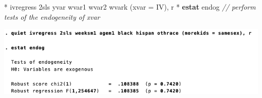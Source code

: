 \documentclass[
  10pt,
  ignorenonframetext,
]{beamer}
\newenvironment{Shaded}{\begin{snugshade}}{\end{snugshade}}
\newcommand{\CommentTok}[1]{\textcolor[rgb]{0.56,0.35,0.01}{\textit{#1}}}
\newcommand{\FunctionTok}[1]{\textcolor[rgb]{0.00,0.00,0.00}{#1}}
\newcommand{\KeywordTok}[1]{\textcolor[rgb]{0.13,0.29,0.53}{\textbf{#1}}}
\newcommand{\NormalTok}[1]{#1}
\begin{document}
\begin{frame}[fragile]{}
\protect\hypertarget{section-5}{}
\small

\begin{Shaded}
\begin{Highlighting}[]
\NormalTok{* ivregress 2sls yvar wvar1 wvar2 wvark (xvar = IV), }\FunctionTok{r}
\NormalTok{* }\KeywordTok{estat}\NormalTok{ endog}
\CommentTok{// perform tests of the endogeneity of xvar}
\end{Highlighting}
\end{Shaded}

\begin{center}\includegraphics[width=1\linewidth]{pictures/res8-estatEndog2SLS} \end{center}
\end{frame}
\end{document}
